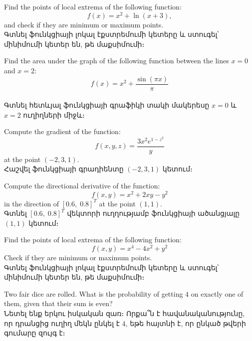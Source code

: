 \begin{problem}
Find the points of local extrema of the following function:
\[ f(x) = x^{2}+\ln\left(x+3\right), \]
and check if they are minimum or maximum points.
\\
\textarmenian{Գտնել ֆունկցիայի լոկալ էքստրեմումի կետերը և ստուգել՝ մինիմումի կետեր են, թե մաքսիմումի։}
\end{problem}
\medskip



\begin{problem}
Find the area under the graph of the following function between the lines $x=0$ and $x=2$:
\[ f(x) = x^{2}+\frac{\sin\left(\pi x\right)}{\pi} \]
\\
\textarmenian{Գտնել հետևյալ ֆունկցիայի գրաֆիկի տակի մակերեսը $x=0$ և $x=2$ ուղիղների միջև։}
\end{problem}
\medskip



\begin{problem}
Compute the gradient of the function:
\[ f(x,y,z) = \dfrac{3x^2e^{1-z^2}}{y} \]
at the point $(-2,3,1)$.
\\
\textarmenian{Հաշվել ֆունկցիայի գրադիենտը $(-2,3,1)$ կետում։}
\end{problem}
\medskip



\begin{problem}
Compute the directional derivative of the function:
\[ f(x,y) = x^2 + 2xy - y^2 \]
in the direction of $[0.6,\;0.8]^T$ at the point $(1, 1)$.
\\
\textarmenian{Գտնել $[0.6,\;0.8]^T$ վեկտորի ուղղությամբ ֆունկցիայի ածանցյալը $(1, 1)$ կետում։}
\end{problem}
\medskip

\begin{problem}
Find the points of local extrema of the following function:
\[f(x, y) = x^4 - 4x^2 + y^2\]
Check if they are minimum or maximum points.
\\
\textarmenian{Գտնել ֆունկցիայի լոկալ էքստրեմումի կետերը և ստուգել՝ մինիմումի կետեր են, թե մաքսիմումի։}
\end{problem}
\medskip



\begin{problem}
Two fair dice are rolled. What is the probability of getting $4$ on exactly one of them, given that their sum is even?
\\
\textarmenian{Նետել ենք երկու իսկական զառ։ Որքա՞ն է հավանականությունը, որ դրանցից ուղիղ մեկն ընկել է $4$, եթե հայտնի է, որ ընկած թվերի գումարը զույգ է։}
\end{problem}
\medskip


